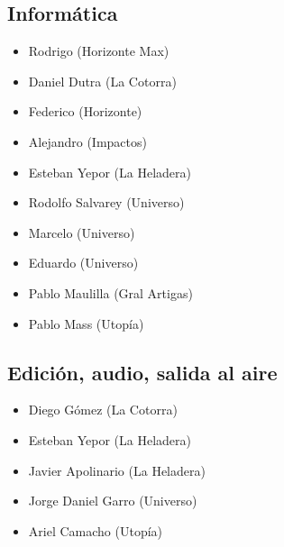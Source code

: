 \subsection{Informática}
\begin{itemize}
 \item Rodrigo (Horizonte Max)
 \item Daniel Dutra (La Cotorra)
 \item Federico (Horizonte)
 \item Alejandro (Impactos)
 \item Esteban Yepor (La Heladera)
 \item Rodolfo Salvarey (Universo)
 \item Marcelo (Universo)
 \item Eduardo (Universo)
 \item Pablo Maulilla (Gral Artigas)
 \item Pablo Mass (Utopía)
\end{itemize}

\subsection{Edición, audio, salida al aire}
\begin{itemize}
 \item Diego Gómez (La Cotorra)
 \item Esteban Yepor (La Heladera)
 \item Javier Apolinario (La Heladera)
 \item Jorge Daniel Garro (Universo)
 \item Ariel Camacho (Utopía)
\end{itemize}